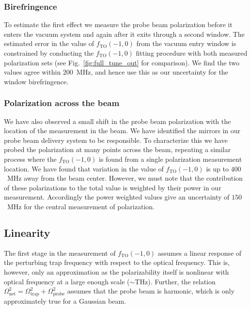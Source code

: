 \documentclass[%
 amsmath,amssymb,
aps,
]{revtex4-2}
\begin{document}
 \subsubsection{Birefringence}
 To estimate the first effect we measure the probe beam polarization before it enters the vacuum system and again after it exits through a second window. The estimated error in the value of \(f_{\mathrm{TO}}(-1,0)\) from the vacuum entry window is constrained by conducting the \(f_{\mathrm{TO}}(-1,0)\) fitting procedure with both measured polarization sets (see Fig.~\ref{fig:full_tune_out} for comparison). We find the two values agree within \(200\)~MHz, and hence use this as our uncertainty for the window birefringence. 
 
\subsubsection{Polarization across the beam}
We have also observed a small shift in the probe beam polarization with the location of the measurement in the beam. We have identified the mirrors in our probe beam delivery system to be responsible. To characterize this we have probed the polarization at many points across the beam, repeating a similar process where the \(f_{\mathrm{TO}}(-1,0)\) is found from a single polarization measurement location. We have found that variation in the value of \(f_{\mathrm{TO}}(-1,0)\) is up to \(400\)~MHz away from the beam center. However, we must note that the contribution of these polarizations to the total value is weighted by their power in our measurement. Accordingly the power weighted values give an uncertainty of \(150\)~MHz for the central measurement of polarization.

\subsection{Linearity} \label{sec:syst.subsec:lin}
The first stage in the measurement of \(f_{\mathrm{TO}}(-1,0)\) assumes a linear response of the  perturbing trap frequency with respect to the optical frequency. This is, however, only an approximation as the polarizability itself is nonlinear with optical frequency at a large enough scale ($\sim$THz). Further, the relation $\Omega_{\text{net}}^2=\Omega_{\text{trap}}^2+\Omega_{\text{probe}}^2$ assumes that the probe beam is harmonic, which is only approximately true for a Gaussian beam.
\end{document}

